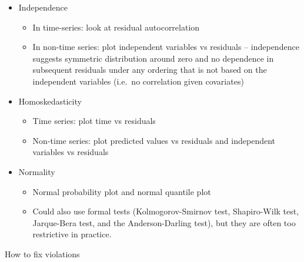 \documentclass[
  letterpaper,
  DIV=11,
  numbers=noendperiod]{scrreprt}
\providecommand{\tightlist}{%
  \setlength{\itemsep}{0pt}\setlength{\parskip}{0pt}}\usepackage{longtable,booktabs,array}
\begin{document}
\begin{itemize}
\item
  Independence

  \begin{itemize}
  \tightlist
  \item
    In time-series: look at residual autocorrelation
  \item
    In non-time series: plot independent variables vs residuals --
    independence suggests symmetric distribution around zero and no
    dependence in subsequent residuals under any ordering that is not
    based on the independent variables (i.e.~no correlation given
    covariates)
  \end{itemize}
\item
  Homoskedasticity

  \begin{itemize}
  \tightlist
  \item
    Time series: plot time vs residuals
  \item
    Non-time series: plot predicted values vs residuals and independent
    variables vs residuals
  \end{itemize}
\item
  Normality

  \begin{itemize}
  \item
    Normal probability plot and normal quantile plot
  \item
    Could also use formal tests (Kolmogorov-Smirnov test, Shapiro-Wilk
    test, Jarque-Bera test, and the Anderson-Darling test), but they are
    often too restrictive in practice.
  \end{itemize}
\end{itemize}

How to fix violations
\end{document}
